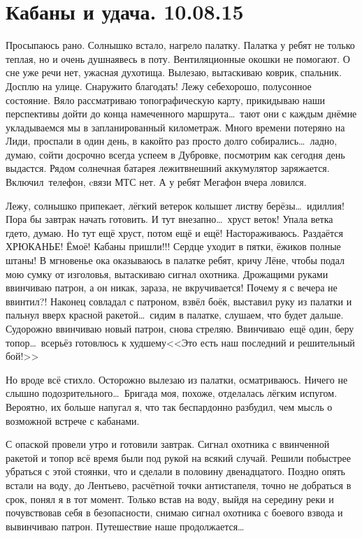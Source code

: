 \chapter{Кабаны и удача. 10.08.15}

Просыпаюсь рано. Солнышко встало, нагрело палатку. Палатка у ребят не только теплая, но и очень душная\mdash весь в поту. Вентиляционные окошки не помогают. О сне уже речи нет, ужасная духотища. Вылезаю, вытаскиваю коврик, спальник. Досплю на улице. Снаружи\sdash то благодать! Лежу себе\mdash хорошо, полусонное состояние. Вяло рассматриваю топографическую карту, прикидываю наши перспективы дойти до конца намеченного маршрута\ldots~тают они с каждым днём\mdash не укладываемся мы в запланированный километраж. Много времени потеряно на Лиди, проспали в один день, в какой\sdash то раз просто долго собирались\ldots~ладно, думаю, сойти досрочно всегда успеем в Дубровке, посмотрим как сегодня день выдастся. Рядом солнечная батарея лежит\mdash внешний аккумулятор заряжается. Включил~телефон, cвязи МТС нет. А у ребят Мегафон вчера ловился. 

Лежу, солнышко припекает, лёгкий ветерок колышет листву берёзы\ldots~идиллия! Пора бы завтрак начать готовить. И тут внезапно\ldots~хруст веток! Упала ветка где\sdash то, думаю. Но тут ещё хруст, потом ещё и ещё! Настораживаюсь. Раздаётся ХРЮКАНЬЕ! Ё\sdash моё! Кабаны пришли!!! Сердце уходит в пятки, ёжиков полные штаны! В мгновенье ока оказываюсь в палатке ребят, кричу Лёне, чтобы подал мою сумку от изголовья, вытаскиваю сигнал охотника. Дрожащими руками ввинчиваю патрон, а он никак, зараза, не вкручивается! Почему я с вечера не ввинтил?! Наконец совладал с патроном, взвёл боёк, выставил руку из палатки и пальнул вверх красной ракетой\ldots~сидим в палатке, слушаем, что будет дальше. Судорожно ввинчиваю новый патрон, снова стреляю. Ввинчиваю~ещё один, беру топор\ldots~всерьёз готовлюсь к худшему\mdash <<Это есть наш последний и решительный бой!>> 

Но вроде всё стихло. Осторожно вылезаю из палатки, осматриваюсь. Ничего не слышно подозрительного\ldots~Бригада моя, похоже, отделалась лёгким испугом. Вероятно, их больше напугал я, что так беспардонно разбудил, чем мысль о возможной встрече с кабанами.

С опаской провели утро и готовили завтрак. Сигнал охотника с ввинченной ракетой и топор всё время были под рукой на всякий случай. Решили побыстрее убраться с этой стоянки, что и сделали в половину двенадцатого. Поздно опять встали на воду, до Лентьево, расчётной точки антистапеля, точно не добраться в срок, понял я в тот момент. Только встав на воду, выйдя на середину реки и почувствовав себя в безопасности, снимаю сигнал охотника с боевого взвода и вывинчиваю патрон. Путешествие наше продолжается\ldots~
 
